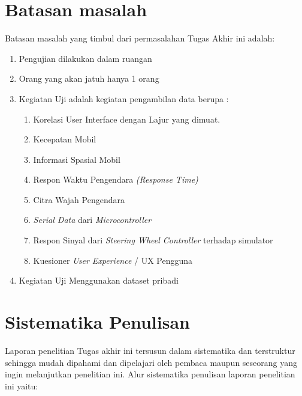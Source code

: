 \section{Batasan masalah}
\vspace{1ex}
Batasan masalah yang timbul dari permasalahan Tugas Akhir ini adalah:
\vspace{1ex}
\begin{enumerate}[nolistsep]
    \item Pengujian dilakukan dalam ruangan
	\cite{cit:4}
	\vspace{1ex}

	\item Orang yang akan jatuh hanya 1 orang
	\vspace{1ex}
	
	\item Kegiatan Uji adalah kegiatan pengambilan data berupa :
	    \begin{enumerate}
	        \item Korelasi User Interface dengan Lajur yang dimuat.
            \item Kecepatan Mobil
            \item Informasi Spasial Mobil
            \item Respon Waktu Pengendara \textit{(Response Time)}
            \item Citra Wajah Pengendara
            \item \textit{Serial Data} dari \textit{Microcontroller}
            \item Respon Sinyal dari \textit{Steering Wheel Controller} terhadap simulator
            \item Kuesioner \textit{User Experience} / UX Pengguna
	    \end{enumerate}
	\vspace{1ex}
	
	\item Kegiatan Uji Menggunakan dataset pribadi
	\vspace{1ex}
		 
\end{enumerate}
\vspace{1ex}

\section{Sistematika Penulisan}
\vspace{1ex}
Laporan penelitian Tugas akhir ini tersusun dalam sistematika dan terstruktur sehingga mudah dipahami dan dipelajari oleh pembaca maupun seseorang yang ingin melanjutkan penelitian ini. Alur sistematika penulisan laporan penelitian ini yaitu:
\vspace{1ex}

